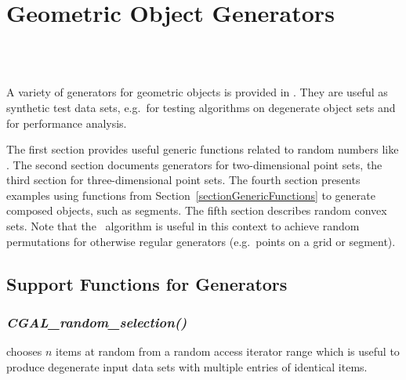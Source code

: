 
\beforecprogskip\medskipamount
\aftercprogskip\medskipamount
\ccParDims

\chapter{Geometric Object Generators}
\label{chapterGenerators}
\\
\\


A variety of generators for geometric objects is provided in \cgal.
They are useful as synthetic test data sets, e.g.~for testing
algorithms on degenerate object sets and for performance analysis.

The first section provides useful generic functions related to random
numbers like . The second section
documents generators for two-dimensional point sets, the third section
for three-dimensional point sets. The fourth section presents examples
using functions from Section~\ref{sectionGenericFunctions} to generate
composed objects, such as segments.  The fifth section describes
random convex sets.  Note that the \stl\ algorithm
 is useful in this context to achieve random
permutations for otherwise regular generators (e.g.~points on a grid
or segment).

\section{Support Functions for Generators}


\subsection{{\it CGAL\_random\_selection()}}
\label{sectionRandomSelection}

 chooses $n$ items at random from a random
access iterator range which is useful to produce degenerate input data
sets with multiple entries of identical items.

